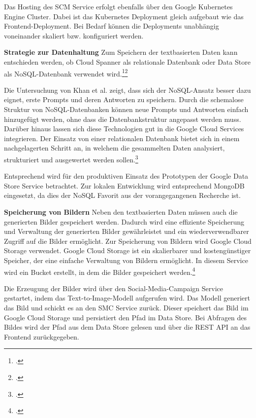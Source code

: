 Das Hosting des SCM Service erfolgt ebenfalls über den Google Kubernetes Engine Cluster.
Dabei ist das Kubernetes Deployment gleich aufgebaut wie das Frontend-Deployment.
Bei Bedarf können die Deployments unabhängig voneinander skaliert bzw. konfiguriert werden.

\textbf{Strategie zur Datenhaltung}\newline
Zum Speichern der textbasierten Daten kann entschieden werden, ob Cloud Spanner als relationale Datenbank oder Data Store als NoSQL-Datenbank verwendet wird.\footcite{google_spanner}\footcite{google_datastore}

Die Untersuchung von Khan et al. zeigt, dass sich der NoSQL-Ansatz besser dazu eignet, erste Prompts und deren Antworten zu speichern.
Durch die schemalose Struktur von NoSQL-Datenbanken können neue Prompts und Antworten einfach hinzugefügt werden, ohne dass die Datenbankstruktur angepasst werden muss.
Darüber hinaus lassen sich diese Technologien gut in die Google Cloud Services integrieren.
Der Einsatz von einer relationalen Datenbank bietet sich in einem nachgelagerten Schritt an, in welchem die gesammelten Daten analysiert, strukturiert und ausgewertet werden sollen.\footcite{Khan2022SQL}

Entsprechend wird für den produktiven Einsatz des Prototypen der Google Data Store Service betrachtet.
Zur lokalen Entwicklung wird entsprechend MongoDB eingesetzt, da dies der NoSQL Favorit aus der vorangegangenen Recherche ist.

\textbf{Speicherung von Bildern}\newline
Neben den textbasierten Daten müssen auch die generierten Bilder gespeichert werden.
Dadurch wird eine effiziente Speicherung und Verwaltung der generierten Bilder gewährleistet und ein wiederverwendbarer Zugriff auf die Bilder ermöglicht.
Zur Speicherung von Bildern wird Google Cloud Storage verwendet.
Google Cloud Storage ist ein skalierbarer und kostengünstiger Speicher, der eine einfache Verwaltung von Bildern ermöglicht.
In diesem Service wird ein Bucket erstellt, in dem die Bilder gespeichert werden.\footcite{google_storage}

Die Erzeugung der Bilder wird über den Social-Media-Campaign Service gestartet, indem das Text-to-Image-Modell aufgerufen wird.
Das Modell generiert das Bild und schickt es an den \ac{SMC} Service zurück.
Dieser speichert das Bild im Google Cloud Storage und persistiert den Pfad im Data Store.
Bei Abfragen des Bildes wird der Pfad aus dem Data Store gelesen und über die \ac{REST} \ac{API} an das Frontend zurückgegeben.

